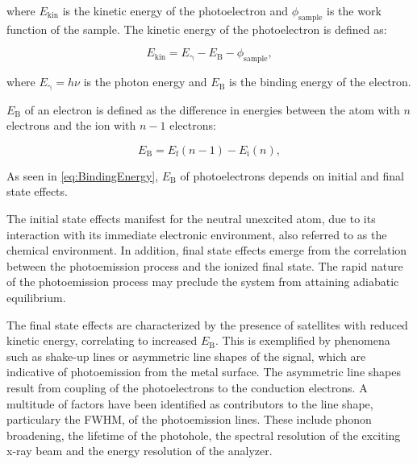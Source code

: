 where $E_\mathrm{kin}$ is the kinetic energy of the photoelectron and $\phi_\mathrm{sample}$ is the work function of the sample. The kinetic energy of the photoelectron is defined as:

\begin{equation}
	\label{eq:KineticEnergy}
	E_\mathrm{kin} = E_\mathrm{\gamma} - E_\mathrm{B} - \phi_\mathrm{sample},
\end{equation}

where $E_\mathrm{\gamma}=h\nu$ is the photon energy and $E_\mathrm{B}$ is the binding energy of the electron.

$E_\mathrm{B}$ of an electron is defined as the difference in energies between the atom with $n$ electrons and the ion with $n-1$ electrons:

\begin{equation}
    \label{eq:BindingEnergy}
    E_\mathrm{B}=E_\mathrm{f}(n-1)-E_\mathrm{i}(n),
\end{equation}

As seen in \autoref{eq:BindingEnergy}, $E_\mathrm{B}$ of photoelectrons depends on initial and final state effects.

The initial state effects manifest for the neutral unexcited atom, due to its interaction with its immediate electronic environment, also referred to as the chemical environment. In addition, final state effects emerge from the correlation between the photoemission process and the ionized final state. The rapid nature of the photoemission process may preclude the system from attaining adiabatic equilibrium.\autocite{Woodruff2016}

The final state effects are characterized by the presence of satellites with reduced kinetic energy, correlating to increased $E_\mathrm{B}$. This is exemplified by phenomena such as shake-up lines or asymmetric line shapes of the signal, which are indicative of photoemission from the metal surface. The asymmetric line shapes result from coupling of the photoelectrons to the conduction electrons.\autocite{Moulder1993}
A multitude of factors have been identified as contributors to the line shape, particulary the \ac{FWHM}, of the photoemission lines. These include phonon broadening, the lifetime of the photohole, the spectral resolution of the exciting x-ray beam and the energy resolution of the analyzer.\autocite{Moulder1993,Fairley2021}

\cleardoublepage
